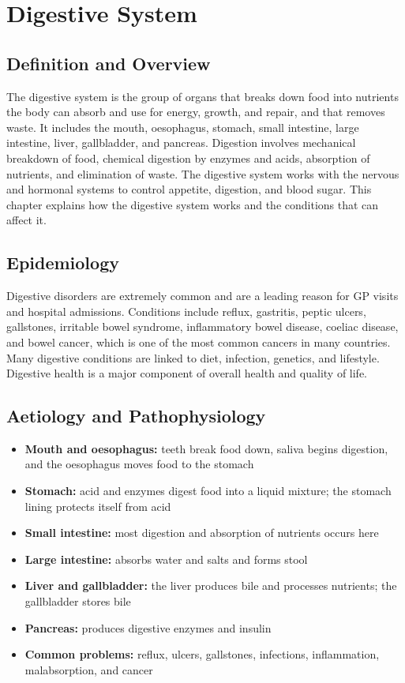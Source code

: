 \chapter{Digestive System}

\section*{Definition and Overview}
The digestive system is the group of organs that breaks down food into nutrients the body can absorb and use for energy, growth, and repair, and that removes waste. It includes the mouth, oesophagus, stomach, small intestine, large intestine, liver, gallbladder, and pancreas. Digestion involves mechanical breakdown of food, chemical digestion by enzymes and acids, absorption of nutrients, and elimination of waste. The digestive system works with the nervous and hormonal systems to control appetite, digestion, and blood sugar. This chapter explains how the digestive system works and the conditions that can affect it.

\section*{Epidemiology}
Digestive disorders are extremely common and are a leading reason for GP visits and hospital admissions. Conditions include reflux, gastritis, peptic ulcers, gallstones, irritable bowel syndrome, inflammatory bowel disease, coeliac disease, and bowel cancer, which is one of the most common cancers in many countries. Many digestive conditions are linked to diet, infection, genetics, and lifestyle. Digestive health is a major component of overall health and quality of life.

\section*{Aetiology and Pathophysiology}
\begin{itemize}
    \item \textbf{Mouth and oesophagus:} teeth break food down, saliva begins digestion, and the oesophagus moves food to the stomach
    \item \textbf{Stomach:} acid and enzymes digest food into a liquid mixture; the stomach lining protects itself from acid
    \item \textbf{Small intestine:} most digestion and absorption of nutrients occurs here
    \item \textbf{Large intestine:} absorbs water and salts and forms stool
    \item \textbf{Liver and gallbladder:} the liver produces bile and processes nutrients; the gallbladder stores bile
    \item \textbf{Pancreas:} produces digestive enzymes and insulin
    \item \textbf{Common problems:} reflux, ulcers, gallstones, infections, inflammation, malabsorption, and cancer
\end{itemize}

